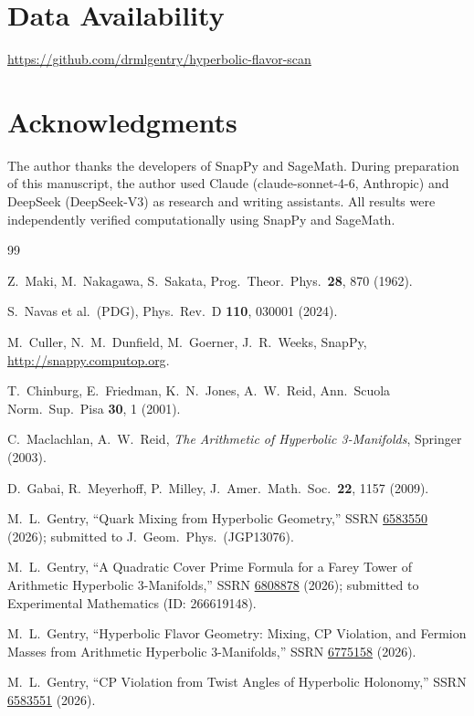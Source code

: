 \documentclass[11pt,a4paper]{article}
\theoremstyle{definition}
\begin{document}
\section*{Data Availability}
\url{https://github.com/drmlgentry/hyperbolic-flavor-scan}

\section*{Acknowledgments}
The author thanks the developers of SnapPy and SageMath.
During preparation of this manuscript, the author used Claude
(claude-sonnet-4-6, Anthropic) and DeepSeek (DeepSeek-V3) as research
and writing assistants. All results were independently verified
computationally using SnapPy and SageMath.

\begin{thebibliography}{99}

Z.~Maki, M.~Nakagawa, S.~Sakata,
Prog.\ Theor.\ Phys.\ \textbf{28}, 870 (1962).

S.~Navas et al.\ (PDG), Phys.\ Rev.\ D \textbf{110}, 030001 (2024).

M.~Culler, N.~M.~Dunfield, M.~Goerner, J.~R.~Weeks,
SnapPy, \url{http://snappy.computop.org}.

T.~Chinburg, E.~Friedman, K.~N.~Jones, A.~W.~Reid,
Ann.\ Scuola Norm.\ Sup.\ Pisa \textbf{30}, 1 (2001).

C.~Maclachlan, A.~W.~Reid,
\emph{The Arithmetic of Hyperbolic 3-Manifolds}, Springer (2003).

D.~Gabai, R.~Meyerhoff, P.~Milley,
J.\ Amer.\ Math.\ Soc.\ \textbf{22}, 1157 (2009).

M.~L.~Gentry,
``Quark Mixing from Hyperbolic Geometry,''
SSRN \href{https://doi.org/10.2139/ssrn.6583550}{6583550} (2026);
submitted to J.\ Geom.\ Phys.\ (JGP13076).

M.~L.~Gentry,
``A Quadratic Cover Prime Formula for a Farey Tower of Arithmetic
Hyperbolic 3-Manifolds,''
SSRN \href{https://doi.org/10.2139/ssrn.6808878}{6808878} (2026);
submitted to Experimental Mathematics (ID: 266619148).

M.~L.~Gentry,
``Hyperbolic Flavor Geometry: Mixing, CP Violation, and Fermion Masses
from Arithmetic Hyperbolic 3-Manifolds,''
SSRN \href{https://doi.org/10.2139/ssrn.6775158}{6775158} (2026).

M.~L.~Gentry,
``CP Violation from Twist Angles of Hyperbolic Holonomy,''
SSRN \href{https://doi.org/10.2139/ssrn.6583551}{6583551} (2026).

\end{thebibliography}
\end{document}
